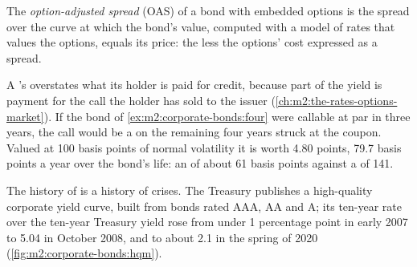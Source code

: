 \begin{definition}\label{def:m2:corporate-bonds:oas}
The \emph{option-adjusted spread} (OAS) of a bond with
embedded options is the spread over the curve at which the bond's value, computed
with a model of rates that values the options, equals its price: the  less
the options' cost expressed as a spread.
\end{definition}

A 's  overstates what its holder is paid for credit, because
part of the yield is payment for the call the holder has sold to the issuer
(\cref{ch:m2:the-rates-options-market}). If the bond of
\cref{ex:m2:corporate-bonds:four} were callable at par in three years, the call
would be a  on the remaining four years struck at the coupon.
Valued at 100 basis points of normal volatility it is worth 4.80 points, 79.7
basis points a year over the bond's life: an  of about 61
basis points against a  of 141.

The history of  is a history of crises. The Treasury publishes a
high-quality corporate yield curve, built from bonds rated AAA, AA and A; its
ten-year rate over the ten-year Treasury yield rose from under 1 percentage point in
early 2007 to 5.04 in October 2008, and to about 2.1 in the spring of 2020
(\cref{fig:m2:corporate-bonds:hqm}).

\begin{omfigure}

\label{fig:m2:corporate-bonds:hqm}
\end{omfigure}

